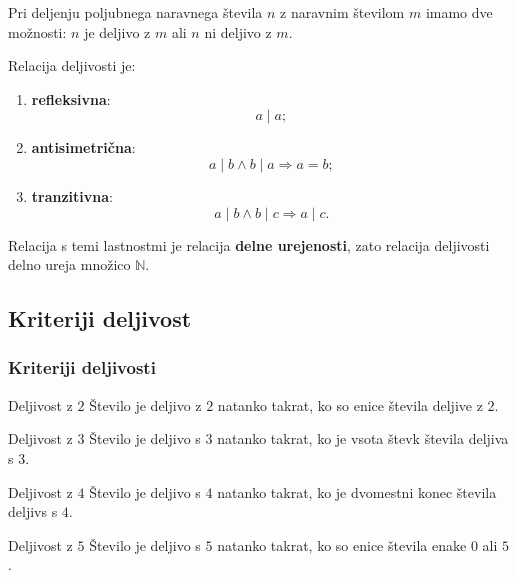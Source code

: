         \begin{frame}
            \begin{block}{}
                Pri deljenju poljubnega naravnega števila $n$ z naravnim številom $m$ imamo dve možnosti: $n$ je deljivo z $m$ ali $n$ ni deljivo z $m$.
            \end{block}

            \begin{block}{}
                Relacija deljivosti je:
                \begin{enumerate}
                    \item \textbf{refleksivna}: $$a\mid a;$$
                    \item \textbf{antisimetrična}: $$a\mid b \wedge b\mid a \Rightarrow a=b;$$
                    \item \textbf{tranzitivna}:  $$a\mid b \wedge b\mid c \Rightarrow a\mid c.$$
                \end{enumerate}
            \end{block}

            \begin{block}{}
                Relacija s temi lastnostmi je relacija \textbf{delne urejenosti}, zato relacija deljivosti delno ureja množico $\mathbb{N}$.
            \end{block}
        \end{frame}

    \subsection{Kriteriji deljivost}

        \begin{frame}
            \frametitle{Kriteriji deljivosti}

            \begin{alertblock}{Deljivost z $2$}
                Število je deljivo z $2$ natanko takrat, ko so enice števila deljive z $2$.
            \end{alertblock}

            \begin{alertblock}{Deljivost z $3$}
                Število je deljivo s $3$ natanko takrat, ko je vsota števk števila deljiva s $3$.
            \end{alertblock}

            \begin{alertblock}{Deljivost z $4$}
                Število je deljivo s $4$ natanko takrat, ko je dvomestni konec števila deljivs s $4$.
            \end{alertblock}

            \begin{alertblock}{Deljivost z $5$}
                Število je deljivo s $5$ natanko takrat, ko so enice števila enake $0$ ali $5$.
            \end{alertblock}

        \end{frame}

